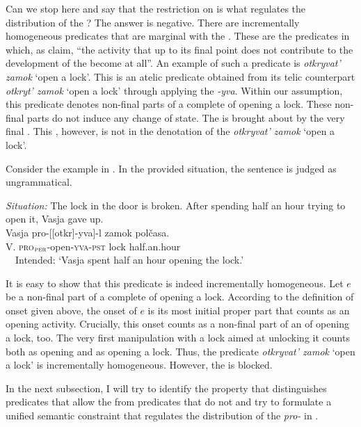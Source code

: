 \documentclass[output=paper,colorlinks,citecolor=brown,newtxmath]{langsci/langscibook}
\begin{document}
Can we stop here and say that the restriction on  is what regulates the distribution of the ? The answer is negative. There are incrementally homogeneous predicates that are marginal with the . These are the predicates in which, as \citet[106]{tatevosov2009event} claim, ``the activity that up to its final point does not contribute to the development of the become  at all''. An example of such a predicate is \textit{otkryvat’ zamok} `open a lock’. This is an atelic predicate obtained from its telic counterpart \textit{otkryt’ zamok} `open a lock’ through applying the  \textit{-yva}. Within our assumption, this predicate denotes non-final parts of a complete  of opening a lock. These non-final parts do not induce any change of state. The  is brought about by the very final . This , however, is not in the denotation of the  \textit{otkryvat’ zamok} `open a lock’.

Consider the example in . In the provided situation, the sentence is judged as ungrammatical.

\ea \label{ex:naumov:32} \textit{Situation:} The lock in the door is broken. After spending half an hour trying to open it, Vasja gave up.\smallskip\\
\gll * Vasja		pro-[[otkr]-yva]-l		zamok		polčasa.\\
    {} V.		\textsc{pro}$_\textsc{per}$-open-\textsc{yva}-\textsc{pst}	lock		half.an.hour\\
\glt \ \ Intended: `Vasja spent half an hour opening the lock.'
\z

\noindent It is easy to show that this predicate is indeed incrementally homogeneous. Let $e$ be a non-final part of a complete  of opening a lock. According to the definition of onset given above, the onset of $e$ is its most initial proper part that counts as an opening activity. Crucially, this onset counts as a non-final part of an  of opening a lock, too. The very first manipulation with a lock aimed at unlocking it counts both as opening and as opening a lock. Thus, the predicate \textit{otkryvat’ zamok} `open a lock’ is incrementally homogeneous. However, the  is blocked.

In the next subsection, I will try to identify the property that distinguishes predicates that allow the  from predicates that do not and try to formulate a unified semantic constraint that regulates the distribution of the  \textit{pro-} in .
\end{document}
